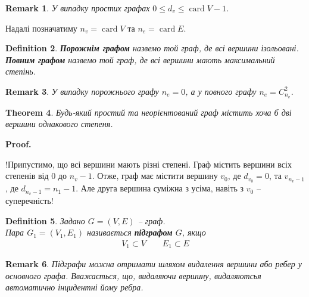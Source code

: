 \documentclass[a4paper, 14pt]{extarticle}
\makeatletter
\theoremstyle{theoremdd}
\newtheorem{theorem}{Theorem}[subsection]
\theoremstyle{theoremdd}
\newtheorem{definition}[theorem]{Definition}
\theoremstyle{theoremdd}
\theoremstyle{theoremdd}
\theoremstyle{theoremdd}
\theoremstyle{theoremdd}
\theoremstyle{theoremdd}
\theoremstyle{theoremdd}
\theoremstyle{theoremdd}
\theoremstyle{theoremdd}
\theoremstyle{theoremdd}
\newtheorem{remark}[theorem]{Remark}
\theoremstyle{theoremdd}
\theoremstyle{theoremdd}
\theoremstyle{theoremdd}
\theoremstyle{theoremdd}
\renewenvironment{proof}[1][Proof.\\]{\par
\pushQED{\hfill \qed}%
\normalfont \topsep6\p@\@plus6\p@\relax
\trivlist
\item\relax
{\bfseries
#1\@addpunct{.}}\hspace\labelsep\ignorespaces
}{%
\popQED\endtrivlist\@endpefalse
}
\DeclareMathOperator{\card}{card}
\makeatother
\begin{document}
\begin{remark}
У випадку простих графах $0 \leq d_v \leq \card V -1$.
\end{remark}

Надалі позначатиму $n_v = \card V$ та $n_e = \card E$.

\begin{definition}
\textbf{Порожнім графом} назвемо той граф, де всі вершини ізольовані. \textbf{Повним графом} назвемо той граф, де всі вершини мають максимальний степінь.
\end{definition}

\begin{remark}
У випадку порожнього графу $n_e= 0$, а у повного графу $n_e = C_{n_v}^2$.
\end{remark}

\begin{theorem}
Будь-який простий та неорієнтований граф містить хоча б дві вершини однакового степеня.
\end{theorem}

\begin{proof}
!Припустимо, що всі вершини мають різні степені. Граф містить вершини всіх степенів від $0$ до $n_v - 1$. Отже, граф має містити вершину $v_0$, де $d_{v_0} = 0$, та $v_{n_v-1}$, де $d_{n_v-1} = n_1-1$. Але друга вершина суміжна з усіма, навіть з $v_0$ -- суперечність!
\end{proof}

\begin{definition}
Задано $G = (V,E)$ -- граф.\\
Пара $G_1 = (V_1,E_1)$ називається \textbf{підграфом} $G$, якщо
\begin{align*}
V_1 \subset V \qquad E_1 \subset E
\end{align*}
\end{definition}

\begin{remark}
Підграфи можна отримати шляхом видалення вершини або ребер у основного графа. Вважається, що, видаляючи вершину, видаляютсья автоматично інцидентні йому ребра.
\end{remark}
\end{document}
